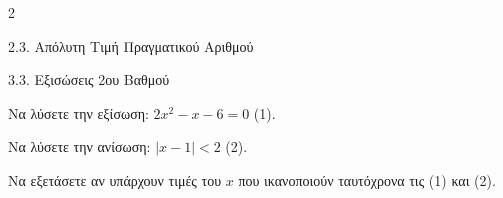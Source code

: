 \begin{ylh}{2}
    \item 2.3. Απόλυτη Τιμή Πραγματικού Αριθμού
    \item 3.3. Εξισώσεις 2ου Βαθμού
\end{ylh}

\begin{alist}
\item Να λύσετε την εξίσωση: $2x^2 - x - 6 = 0$ (1). 
\item Να λύσετε την ανίσωση: $|x - 1| < 2$ (2). 
\item Να εξετάσετε αν υπάρχουν τιμές του $x$ που ικανοποιούν ταυτόχρονα τις (1) και (2). 
\end{alist}

